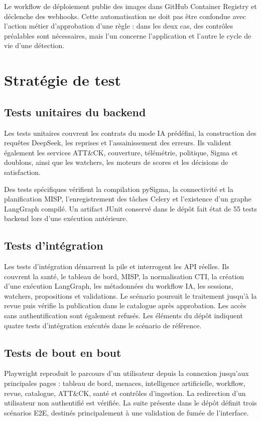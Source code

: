 Le workflow de déploiement publie des images dans GitHub Container Registry et déclenche des webhooks. Cette automatisation ne doit pas être confondue avec l'action métier d'approbation d'une règle : dans les deux cas, des contrôles préalables sont nécessaires, mais l'un concerne l'application et l'autre le cycle de vie d'une détection.

\section{Stratégie de test}

\subsection{Tests unitaires du backend}

Les tests unitaires couvrent les contrats du mode IA prédéfini, la construction des requêtes DeepSeek, les reprises et l'assainissement des erreurs. Ils valident également les services ATT\&CK, couverture, télémétrie, politique, Sigma et doublons, ainsi que les watchers, les moteurs de scores et les décisions de satisfaction.

Des tests spécifiques vérifient la compilation pySigma, la connectivité et la planification MISP, l'enregistrement des tâches Celery et l'existence d'un graphe LangGraph compilé. Un artifact JUnit conservé dans le dépôt fait état de 55 tests backend lors d'une exécution antérieure.

\subsection{Tests d'intégration}

Les tests d'intégration démarrent la pile et interrogent les API réelles. Ils couvrent la santé, le tableau de bord, MISP, la normalisation CTI, la création d'une exécution LangGraph, les métadonnées du workflow IA, les sessions, watchers, propositions et validations. Le scénario poursuit le traitement jusqu'à la revue puis vérifie la publication dans le catalogue après approbation. Les accès sans authentification sont également refusés. Les éléments du dépôt indiquent quatre tests d'intégration exécutés dans le scénario de référence.

\subsection{Tests de bout en bout}

Playwright reproduit le parcours d'un utilisateur depuis la connexion jusqu'aux principales pages : tableau de bord, menaces, intelligence artificielle, workflow, revue, catalogue, ATT\&CK, santé et contrôles d'ingestion. La redirection d'un utilisateur non authentifié est vérifiée. La suite présente dans le dépôt définit trois scénarios E2E, destinés principalement à une validation de fumée de l'interface.

